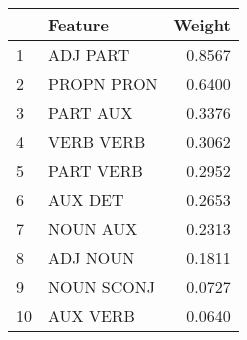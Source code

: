 \begin{tabular}{llr}
\toprule
{} &     Feature &  Weight \\
\midrule
1  &    ADJ PART &  0.8567 \\
2  &  PROPN PRON &  0.6400 \\
3  &    PART AUX &  0.3376 \\
4  &   VERB VERB &  0.3062 \\
5  &   PART VERB &  0.2952 \\
6  &     AUX DET &  0.2653 \\
7  &    NOUN AUX &  0.2313 \\
8  &    ADJ NOUN &  0.1811 \\
9  &  NOUN SCONJ &  0.0727 \\
10 &    AUX VERB &  0.0640 \\
\bottomrule
\end{tabular}
